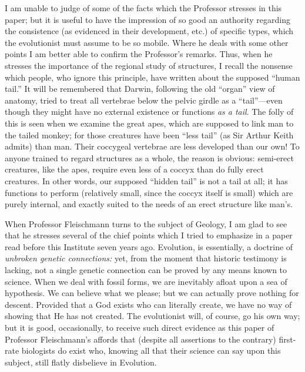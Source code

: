 I am unable to judge of some of the facts which the Professor stresses in this paper; but it is
useful to have the impression of so good an authority regarding the consistence (as evidenced
in their development, etc.) of specific types, which the evolutionist must assume to be so
mobile. Where he deals with some other points I am better able to confirm the Professor's
remarks. Thus, when he stresses the importance of the regional study of structures, I recall
the nonsense which people, who ignore this principle, have written about the supposed
``human tail.'' It will be remembered that Darwin, following the old ``organ'' view of anatomy,
tried to treat all vertebrae below the pelvic girdle as a ``tail''—even though they might have
no external existence or functions \textit{as a tail}. The folly of this is seen when we examine the
great apes, which are supposed to link man to the tailed monkey; for those creatures have
been ``less tail'' (as Sir Arthur Keith admits) than man. Their coccygeal vertebrae are less
developed than our own! To anyone trained to regard structures as a whole, the reason is
obvious: semi-erect creatures, like the apes, require even less of a coccyx than do fully erect
creatures. In other words, our supposed ``hidden tail'' is not a tail at all; it has functions to
perform (relatively small, since the coccyx itself is small) which are purely internal, and
exactly suited to the needs of an erect structure like man's.

When Professor Fleischmann turns to the subject of Geology, I am glad to see that he stresses
several of the chief points which I tried to emphasize in a paper read before this Institute
seven years ago. Evolution, is essentially, a doctrine of \textit{unbroken genetic connections:} yet,
from the moment that historic testimony is lacking, not a single genetic connection can be
proved by any means known to science. When we deal with fossil forms, we are inevitably
afloat upon a sea of hypothesis. We can believe what we please; but we can actually prove
nothing for descent. Provided that a God exists who can literally create, we have no way of
showing that He has not created. The evolutionist will, of course, go his own way; but it is
good, occasionally, to receive such direct evidence as this paper of Professor Fleischmann's
affords that (despite all assertions to the contrary) first-rate biologists do exist who, knowing
all that their science can say upon this subject, still flatly disbelieve in Evolution.

